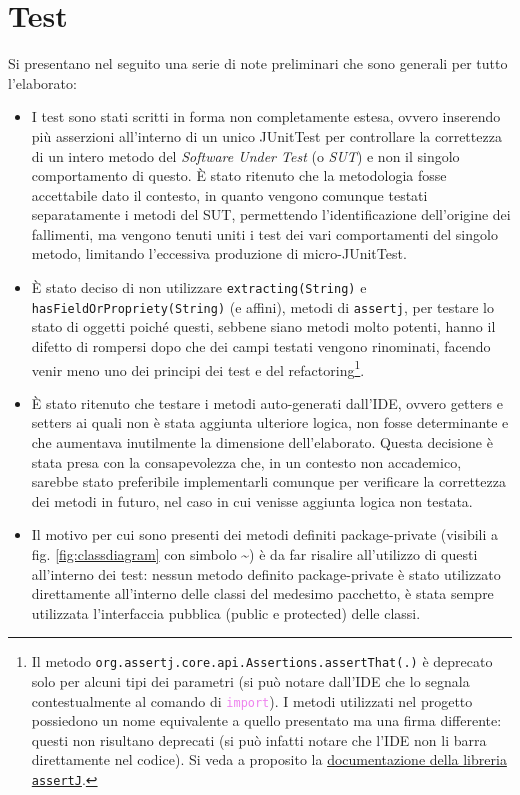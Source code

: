 \documentclass[a4paper,11pt]{article}
\begin{document}
	\section{Test}
	Si presentano nel seguito una serie di note preliminari che sono generali per tutto l'elaborato:
	\begin{itemize}\setlength\itemsep{-3pt}
		\item I test sono stati scritti in forma non completamente estesa, ovvero inserendo più asserzioni all'interno di un unico JUnitTest per controllare la correttezza di un intero metodo del \textit{Software Under Test} (o \textit{SUT}) e non il singolo comportamento di questo. È stato ritenuto che la metodologia fosse accettabile dato il contesto, in quanto vengono comunque testati separatamente i metodi del SUT, permettendo l'identificazione dell'origine dei fallimenti, ma vengono tenuti uniti i test dei vari comportamenti del singolo metodo, limitando l'eccessiva produzione di micro-JUnitTest.
		\item È stato deciso di non utilizzare \texttt{extracting(String)} e \texttt{hasFieldOrPropriety(String)} (e affini), metodi di \texttt{assertj}, per testare lo stato di oggetti poiché questi, sebbene siano metodi molto potenti, hanno il difetto di rompersi dopo che dei campi testati vengono rinominati, facendo venir meno uno dei principi dei test e del refactoring\footnote{Il metodo \texttt{org.assertj.core.api.Assertions.assertThat(.)} è deprecato solo per alcuni tipi dei parametri (si può notare dall'IDE che lo segnala contestualmente al comando di \textcolor{violet}{\texttt{import}}). I metodi utilizzati nel progetto possiedono un nome equivalente a quello presentato ma una firma differente: questi non risultano deprecati (si può infatti notare che l'IDE non li barra direttamente nel codice). Si veda a proposito la \href{https://www.javadoc.io/doc/org.assertj/assertj-core/3.26.0/org/assertj/core/api/Assertions.html}{documentazione della libreria \texttt{assertJ}}.}.
		\item È stato ritenuto che testare i metodi auto-generati dall'IDE, ovvero getters e setters ai quali non è stata aggiunta ulteriore logica, non fosse determinante e che aumentava inutilmente la dimensione dell'elaborato. Questa decisione è stata presa con la consapevolezza che, in un contesto non accademico, sarebbe stato preferibile implementarli comunque per verificare la correttezza dei metodi in futuro, nel caso in cui venisse aggiunta logica non testata.
		\item Il motivo per cui sono presenti dei metodi definiti package-private (visibili a fig. \ref{fig:classdiagram} con simbolo \textbf{\textasciitilde}) è da far risalire all'utilizzo di questi all'interno dei test: nessun metodo definito package-private è stato utilizzato direttamente all'interno delle classi del medesimo pacchetto, è stata sempre utilizzata l'interfaccia pubblica (public e protected) delle classi. 
	\end{itemize}
	
\end{document}
